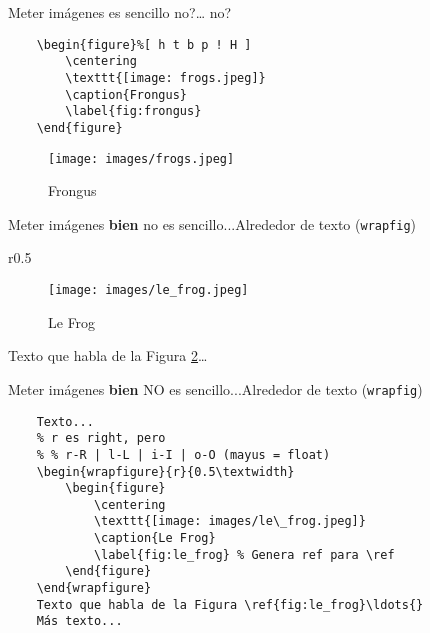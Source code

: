 \begin{frame}[fragile]{Meter imágenes es sencillo no?\ldots{} no?}

    {\small
    \begin{verbatim}
    \begin{figure}%[ h t b p ! H ]
        \centering
        \texttt{[image: frogs.jpeg]}
        \caption{Frongus}
        \label{fig:frongus}
    \end{figure}
    \end{verbatim}
    }

    \pause
    
    \begin{figure}
        \centering
        \texttt{[image: images/frogs.jpeg]}
        \caption{Frongus}
        \label{fig:frongus}
    \end{figure}
\end{frame}


\begin{frame}{Meter imágenes \textbf{bien} no es sencillo...}{Alrededor de texto (\texttt{wrapfig})}

    \pause
    \begin{wrapfigure}{r}{0.5\textwidth}
        \begin{figure}
            \centering
            \texttt{[image: images/le\_frog.jpeg]}
            \caption{Le Frog}
            \label{fig:le_frog}
        \end{figure}
    \end{wrapfigure}
    Texto que habla de la Figura \ref{fig:le_frog}\ldots{}
    \blindtext
    
\end{frame}

\begin{frame}[fragile]{Meter imágenes \textbf{bien} NO es sencillo...}{Alrededor de texto (\texttt{wrapfig})}

{\small
\begin{verbatim}
    Texto...
    % r es right, pero
    % % r-R | l-L | i-I | o-O (mayus = float)
    \begin{wrapfigure}{r}{0.5\textwidth}
        \begin{figure}
            \centering
            \texttt{[image: images/le\_frog.jpeg]}
            \caption{Le Frog}
            \label{fig:le_frog} % Genera ref para \ref
        \end{figure}
    \end{wrapfigure}
    Texto que habla de la Figura \ref{fig:le_frog}\ldots{}
    Más texto...
\end{verbatim}
}
    
\end{frame}

